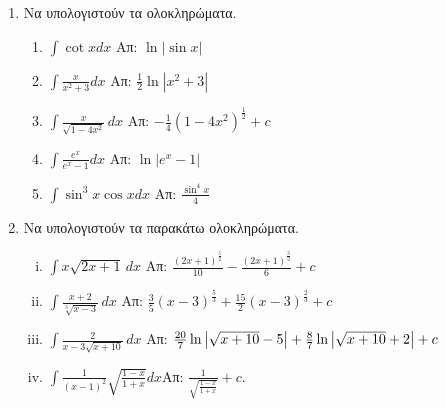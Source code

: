 \documentclass[a4paper]{article}
\theoremstyle{definition}
\theoremstyle{remark}
\begin{document}
\begin{enumerate}
\item Να υπολογιστούν τα ολοκληρώματα.

\begin{enumerate}
\item $\int \cot x dx$ \hfill Απ: $\ln|\sin x|$
\item $\int\frac{x}{x^2+3}dx$ \hfill Απ: $\frac{1}{2}\ln|x^2+3|$
\item $\int\frac{x}{\sqrt{1-4x^2}}\,dx$ \hfill Απ: $-\frac{1}{4}(1-4x^2)^{\frac{1}{2}}+c$
\item $\int \frac{e^x}{e^x-1}dx$ \hfill Απ: $\ln|e^x-1|$
\item $\int \sin^3x\cos x dx$ \hfill Απ: $\frac{\sin^4x}{4}$
\end{enumerate}

\item Να υπολογιστούν τα παρακάτω ολοκληρώματα.

\begin{enumerate}[i)]
\item $\int x\sqrt{2x+1}\,dx$ \hfill Απ: $\frac{(2x+1)^{\frac{5}{2}}}{10}-\frac{(2x+1)^{\frac{3}{2}}}{6}+c$
\item $\int\frac{x+2}{\sqrt[3]{x-3}}\,dx$ \hfill Απ: $\frac{3}{5}(x-3)^{\frac{5}{3}}+\frac{15}{2}(x-3)^{\frac{2}{3}}+c$
\item $\int\frac{2}{x-3\sqrt{x+10}}\,dx$ \hfill Απ: $\frac{20}{7}\ln\abs{\sqrt{x+10}-5}+\frac{8}{7}\ln\abs{\sqrt{x+10}+2}+c$
\item $\int\frac{1}{(x-1)^2}\sqrt{\frac{1-x}{1+x}}dx$\hfill Απ: $\frac{1}{\sqrt{\frac{1-x}{1+x}}}+c$.
\end{enumerate}

\end{enumerate}
\end{document}
